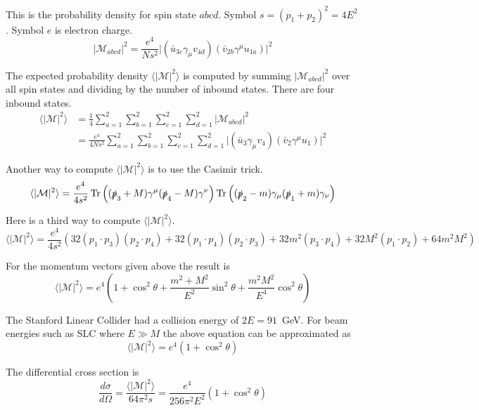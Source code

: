 \documentclass[12pt]{article}
\begin{document}
\bigskip
\noindent
This is the probability density for spin state $abcd$.
Symbol $s=(p_1+p_2)^2=4E^2$.
Symbol $e$ is electron charge.
\begin{equation*}
\big|\mathcal{M}_{abcd}\big|^2
=\frac{e^4}{Ns^2}\big|(\bar{u}_{3c}\gamma_\mu v_{4d})(\bar{v}_{2b}\gamma^\mu u_{1a})\big|^2
\end{equation*}

\noindent
The expected probability density $\langle|\mathcal{M}|^2\rangle$
is computed by summing $|\mathcal{M}_{abcd}|^2$ over all spin states
and dividing by the number of inbound states.
There are four inbound states.
\begin{align*}
\langle|\mathcal{M}|^2\rangle
&=\frac{1}{4}\sum_{a=1}^2\sum_{b=1}^2\sum_{c=1}^2\sum_{d=1}^2|\mathcal{M}_{abcd}|^2
\\
&=\frac{e^4}{4Ns^2}\sum_{a=1}^2\sum_{b=1}^2\sum_{c=1}^2\sum_{d=1}^2
\big|(\bar{u}_3\gamma_\mu v_4)(\bar{v}_2\gamma^\mu u_1)\big|^2
\end{align*}

\noindent
Another way to compute $\langle|\mathcal{M}|^2\rangle$ is to use the Casimir trick.
\begin{equation*}
\langle|\mathcal{M}|^2\rangle
=\frac{e^4}{4s^2}
\mathop{\rm Tr}\left((\slashed{p}_3+M)\gamma^\mu(\slashed{p}_4-M)\gamma^\nu\right)
\mathop{\rm Tr}\left((\slashed{p}_2-m)\gamma_\mu(\slashed{p}_1+m)\gamma_\nu\right)
\end{equation*}

\noindent
Here is a third way to compute $\langle|\mathcal{M}|^2\rangle$.
\begin{equation*}
\langle|\mathcal{M}|^2\rangle
=\frac{e^4}{4s^2}
\left(
32 (p_1\cdot p_3) (p_2\cdot p_4) +
32 (p_1\cdot p_4) (p_2\cdot p_3) +
32 m^2 (p_3\cdot p_4) +
32 M^2 (p_1\cdot p_2) +
64 m^2 M^2
\right)
\end{equation*}

\noindent
For the momentum vectors given above the result is
\begin{equation*}
\langle|\mathcal{M}|^2\rangle
=e^4\left(1+\cos^2\theta+\frac{m^2+M^2}{E^2}\sin^2\theta+\frac{m^2M^2}{E^4}\cos^2\theta\right)
\end{equation*}

\noindent
The Stanford Linear Collider
had a collision energy of $2E=91$~GeV.
For beam energies such as SLC where $E\gg M$ the above equation can be approximated as
$$
\langle|\mathcal{M}|^2\rangle=e^4(1+\cos^2\theta)
$$

\noindent
The differential cross section is
$$
\frac{d\sigma}{d\Omega}
=\frac{\langle|\mathcal{M}|^2\rangle}{64\pi^2s}
=\frac{e^4}{256\pi^2E^2}(1+\cos^2\theta)
$$
\end{document}
